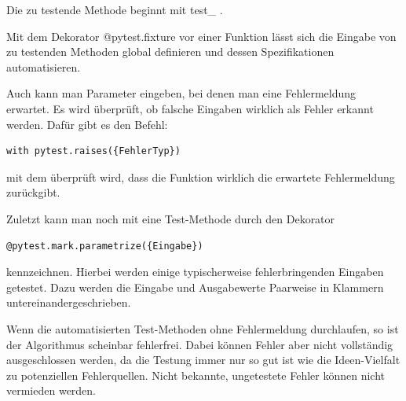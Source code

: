 \documentclass[]{dsadokumentation}
\begin{document}
Die zu testende Methode beginnt mit test\_ .

Mit dem Dekorator @pytest.fixture vor einer Funktion lässt sich die Eingabe von zu testenden Methoden global definieren und dessen Spezifikationen automatisieren.

Auch kann man Parameter eingeben, bei denen man eine Fehlermeldung erwartet. Es wird überprüft, ob falsche Eingaben wirklich als Fehler erkannt werden. Dafür gibt es den Befehl:

\begin{verbatim}
with pytest.raises({FehlerTyp})
\end{verbatim}

mit dem überprüft wird, dass die Funktion wirklich die erwartete Fehlermeldung zurückgibt.

Zuletzt kann man noch mit eine Test-Methode durch den Dekorator

\begin{verbatim}
@pytest.mark.parametrize({Eingabe})
\end{verbatim}

kennzeichnen. Hierbei werden einige typischerweise fehlerbringenden Eingaben getestet. Dazu werden die Eingabe und Ausgabewerte Paarweise in Klammern untereinandergeschrieben.

Wenn die automatisierten Test-Methoden ohne Fehlermeldung durchlaufen, so ist der Algorithmus scheinbar fehlerfrei. Dabei können Fehler aber nicht vollständig ausgeschlossen werden, da die Testung immer nur so gut ist wie die Ideen-Vielfalt zu potenziellen Fehlerquellen. Nicht bekannte, ungetestete Fehler können nicht vermieden werden.
\end{document}
